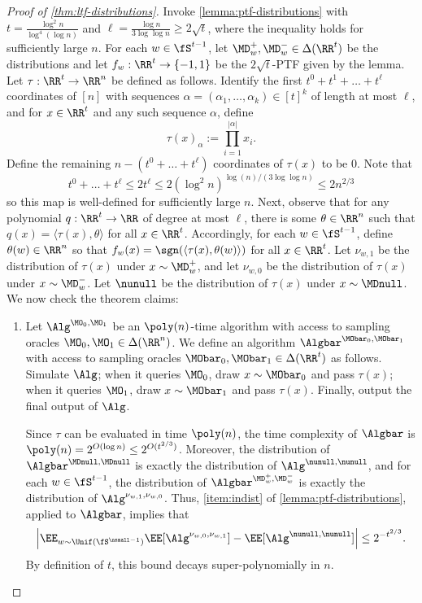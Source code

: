 \begin{proof}[Proof of \cref{thm:ltf-distributions}]
Invoke \cref{lemma:ptf-distributions} with $t = \frac{\log^2 n}{\log^4(\log n)}$ and $\ell = \frac{\log n}{3\log \log n} \geq 2\sqrt{t}$, where the inequality holds for sufficiently large $n$. For each $w \in \fS^{t-1}$, let $\MD_w^+,\MD_w^- \in \Delta(\RR^t)$ be the distributions and let $f_w: \RR^t \to \{-1,1\}$ be the $2\sqrt{t}$-PTF given by the lemma. Let $\tau: \RR^t \to \RR^n$ be defined as follows. Identify the first $t^0 + t^1 + \dots + t^\ell$ coordinates of $[n]$ with sequences $\alpha = (\alpha_1,\dots,\alpha_k) \in [t]^k$ of length at most $\ell$, and for $x \in \RR^t$ and any such sequence $\alpha$, define
\[\tau(x)_\alpha := \prod_{i=1}^{|\alpha|} x_i.\]
Define the remaining $n - (t^0+\dots+t^\ell)$ coordinates of $\tau(x)$ to be $0$. Note that \[t^0+\dots+t^\ell \leq 2t^\ell \leq 2(\log^2 n)^{\log(n)/(3\log\log n)} \leq 2n^{2/3}\]
so this map is well-defined for sufficiently large $n$. Next, observe that for any polynomial $q: \RR^t \to \RR$ of degree at most $\ell$, there is some $\theta \in \RR^n$ such that $q(x) = \langle \tau(x), \theta\rangle$ for all $x \in \RR^t$. Accordingly, for each $w \in \fS^{t-1}$, define $\theta(w) \in \RR^n$ so that $f_w(x) = \sgn(\langle \tau(x), \theta(w)\rangle)$ for all $x \in \RR^t$. Let $\nu_{w,1}$ be the distribution of $\tau(x)$ under $x \sim \MD_w^+$, and let $\nu_{w,0}$ be the distribution of $\tau(x)$ under $x \sim \MD_w^-$. Let $\nunull$ be the distribution of $\tau(x)$ under $x \sim \MDnull$. We now check the theorem claims:
\begin{enumerate}
\item Let $\Alg^{\MO_0,\MO_1}$ be an $\poly(n)$-time algorithm with access to sampling oracles $\MO_0,\MO_1 \in \Delta(\RR^n)$. We define an algorithm $\Algbar^{\MObar_0,\MObar_1}$ with access to sampling oracles $\MObar_0,\MObar_1 \in \Delta(\RR^t)$ as follows. Simulate $\Alg$; when it queries $\MO_0$, draw $x \sim \MObar_0$ and pass $\tau(x)$; when it queries $\MO_1$, draw $x \sim \MObar_1$ and pass $\tau(x)$. Finally, output the final output of $\Alg$.

Since $\tau$ can be evaluated in time $\poly(n)$, the time complexity of $\Algbar$ is $\poly(n) = 2^{O(\log n)} \leq 2^{O(t^{2/3})}$. Moreover, the distribution of $\Algbar^{\MDnull,\MDnull}$ is exactly the distribution of $\Alg^{\nunull,\nunull}$, and for each $w \in \fS^{t-1}$, the distribution of $\Algbar^{\MD_w^+,\MD_w^-}$ is exactly the distribution of $\Alg^{\nu_{w,1},\nu_{w,0}}$. Thus, \cref{item:indist} of \cref{lemma:ptf-distributions}, applied to $\Algbar$, implies that
\[\left|\EE_{w \sim \Unif(\fS^{\nsmall-1})} \EE[\Alg^{\nu_{w,0},\nu_{w,1}}] - \EE[\Alg^{\nunull,\nunull}]\right| \leq 2^{-t^{2/3}}.\]
By definition of $t$, this bound decays super-polynomially in $n$.


\end{enumerate}
\end{proof}

